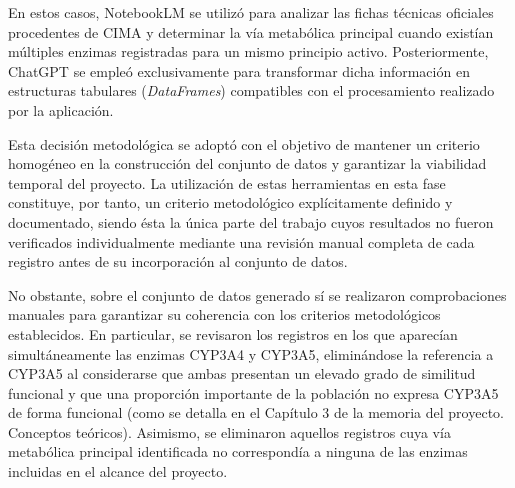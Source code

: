 En estos casos, NotebookLM se utilizó para analizar las fichas técnicas oficiales procedentes de CIMA y determinar la vía metabólica principal cuando existían múltiples enzimas registradas para un mismo principio activo. Posteriormente, ChatGPT se empleó exclusivamente para transformar dicha información en estructuras tabulares (\textit{DataFrames}) compatibles con el procesamiento realizado por la aplicación.

Esta decisión metodológica se adoptó con el objetivo de mantener un criterio homogéneo en la construcción del conjunto de datos y garantizar la viabilidad temporal del proyecto. La utilización de estas herramientas en esta fase constituye, por tanto, un criterio metodológico explícitamente definido y documentado, siendo ésta la única parte del trabajo cuyos resultados no fueron verificados individualmente mediante una revisión manual completa de cada registro antes de su incorporación al conjunto de datos.

No obstante, sobre el conjunto de datos generado sí se realizaron comprobaciones manuales para garantizar su coherencia con los criterios metodológicos establecidos. En particular, se revisaron los registros en los que aparecían simultáneamente las enzimas CYP3A4 y CYP3A5, eliminándose la referencia a CYP3A5 al considerarse que ambas presentan un elevado grado de similitud funcional y que una proporción importante de la población no expresa CYP3A5 de forma funcional (como se detalla en el Capítulo 3 de la memoria del proyecto. Conceptos teóricos). Asimismo, se eliminaron aquellos registros cuya vía metabólica principal identificada no correspondía a ninguna de las enzimas incluidas en el alcance del proyecto.


